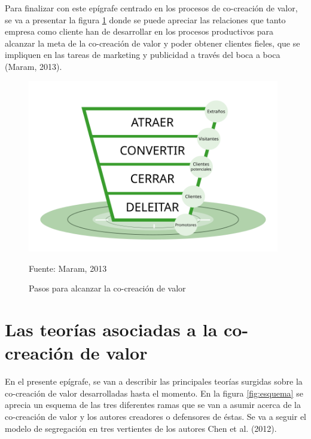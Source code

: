 \begin{enumerate}
\end{enumerate}

Para finalizar con este epígrafe centrado en los procesos de co-creación de valor, se va a presentar la figura \ref{fig:metasMaram} donde se puede apreciar las relaciones que tanto empresa como cliente han de desarrollar en los procesos productivos para alcanzar la meta de la co-creación de valor y poder obtener clientes fieles, que se impliquen en las tareas de marketing y publicidad a través del boca a boca (Maram, 2013).

\begin{figure}[!h]
	\caption{Pasos para alcanzar la co-creación de valor}
	\centering \includegraphics[width=110mm]{capitulos/graficos/metasMaram} 
	\label{fig:metasMaram} 
	
		\footnotesize
		Fuente: Maram, 2013
\end{figure}

\section{Las teorías asociadas a la co-creación de valor}

En el presente epígrafe, se van a describir las principales teorías surgidas sobre la co-creación de valor desarrolladas hasta el momento. En la figura \ref{fig:esquema} se aprecia un esquema de las tres diferentes ramas que se van a asumir acerca de la co-creación de valor y los autores creadores o defensores de éstas. Se va a seguir el modelo de segregación en tres vertientes de los autores Chen et al. (2012).

